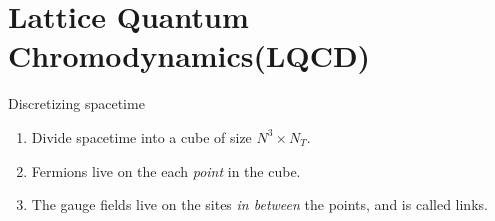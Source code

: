 \documentclass[10pt,show notes on second screen]{beamer}
\begin{document}
\section{Lattice Quantum Chromodynamics(LQCD)}

\begin{frame}{Discretizing spacetime}
\begin{enumerate}[<+->]
    \item Divide spacetime into a cube of size $N^3\times N_T$.
    \item Fermions live on the each \textit{point} in the cube.
    \item The gauge fields live on the sites \textit{in between} the points, and is called links.
\end{enumerate}
\end{frame}
\end{document}
